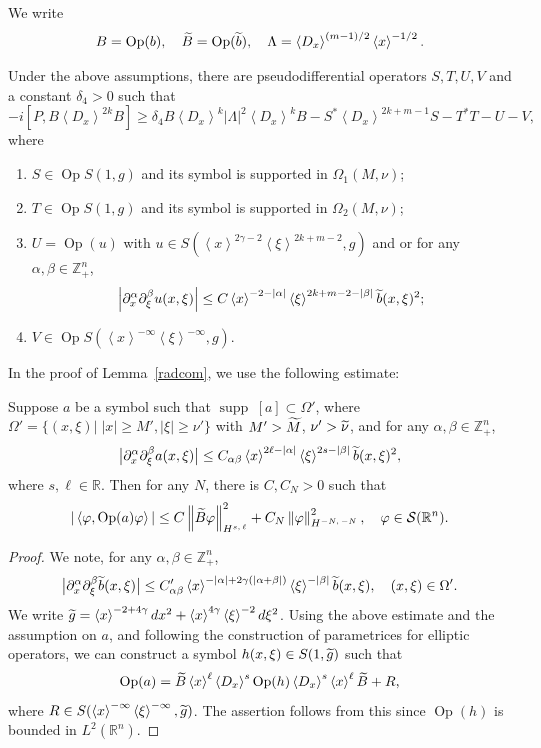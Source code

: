 \documentclass[AHL,Unicode,longabstracts,published]{cedram}
\renewcommand*\a{\alpha}
\renewcommand*\b{\beta}
\renewcommand*\c{\gamma}
\renewcommand*\d{\delta}
\newcommand*\f{\varphi}
\newcommand*\n{\nu}
\newcommand*\x{\xi}
\renewcommand{\L}{\Lambda}
\renewcommand{\O}{\Omega}
\DeclareMathOperator{\Op}{Op}
\newcommand*\re{\mathbb{R}}
\newcommand*\ze{\mathbb{Z}}
\newcommand{\clS}{\mathcal{S}}
\newcommand*\pa{\partial}
\DeclareMathOperator{\supp}{supp\;}
\newcommand{\jap}[1]{\left\langle #1 \right\rangle}
\newcommand{\norm}[1]{\left\| #1 \right\|}
\newcommand{\bigabs}[1]{\bigl| #1 \bigr|}
\let\oldtilde\tilde
\renewcommand*{\tilde}[1]{\mathchoice{\widetilde{#1}}{\widetilde{#1}}{\oldtilde{#1}}{\oldtilde{#1}}}
\begin{document}
We write
\[
B=\Op(b), \quad \tilde B =\Op(\tilde b), \quad \L=\jap{D_x}^{(m-1)/2}\jap{x}^{-1/2}.
\]

\begin{lemm}\label{radcom}
Under the above assumptions, there are pseudodifferential operators
$S,T,U, V$ and a constant $\d_4>0$ such that
\[
-i\left[P, B \jap{D_x}^{2k} B\right] \geq \d_4 B\jap{D_x}^k |\L|^2\jap{D_x}^k B -S^*\jap{D_x}^{2k+m-1}S-T^*T-U -V,
\]
where
\begin{enumerate}
\item $S\in \Op S(1,g)$ and its symbol is supported in $\O_1(M,\n)$;
\item $T\in \Op S(1, g)$ and its symbol is supported in $\O_2(M,\n)$;
\item $U=\Op(u)$ with $u\in S(\jap{x}^{2\c-2}\jap{\x}^{2k+m-2},g)$ and or for any $\a,\b\in\ze_+^n$,
\[
\left|\pa_{x}^{\a}\pa_{\x}^{\b}u(x,\x)\right|\leq C\jap{x}^{-2-|\a|}\jap{\x}^{2k+m-2-|\b|} \tilde b(x,\x)^2;
\]
\item $V\in \Op S(\jap{x}^{-\infty}\jap{\x}^{-\infty},g)$.
\end{enumerate}
\end{lemm}

In the proof of Lemma~\ref{radcom}, we use the following estimate:

\begin{lemm}\label{radell}
Suppose $a$ be a symbol such that $\supp[a]\subset\O'$, where\linebreak$\O'=\{(x,\x)|\;|x|\geq M',|\x|\geq \n'\}$ with $M'>\tilde M$, $\n'>\tilde\n$, and for any $\a,\b\in\ze_+^n$,
\[
\bigabs{\pa_x^\a\pa_\x^\b a(x,\x)}\leq C_{\a\b}\jap{x}^{2\ell-|\a|}\jap{\x}^{2s-|\b|}\tilde b(x,\x)^2,
\]
where $s,\ell\in\re$. Then for any $N$, there is $C,C_N>0$ such that
\[
|\jap{\f,\Op(a)\f}|\leq C \norm{\tilde B\f}^2_{H^{s,\,\ell}}+C_N\norm{\f}^2_{H^{-N,\,-N}},
\quad \f\in\clS(\re^n).
\]
\end{lemm}

\begin{proof}
We note, for any $\a,\b\in\ze_+^n$,
\[
\bigabs{\pa_x^\a\pa_\x^\b \tilde b(x,\x)}\leq C'_{\a\b}\jap{x}^{-|\a|+2\c(|\a+\b|)}\jap{\x}^{-|\b|}\tilde b(x,\x),
\quad(x,\x)\in\O'.
\]
We write $\tilde g= \jap{x}^{-2+4\c}dx^2+\jap{x}^{4\c}\jap{\x}^{-2}d\x^2$. Using the above estimate and the assumption on $a$, and following the construction of parametrices for elliptic operators, we can construct a symbol $h(x,\x)\in S(1,\tilde g)$ such that
\[
\Op(a) = \tilde B \jap{x}^\ell \jap{D_x}^s \Op(h) \jap{D_x}^s \jap{x}^\ell \tilde B +R,
\]
where $R\in S(\jap{x}^{-\infty}\jap{\x}^{-\infty},\tilde g)$. The assertion follows from this since $\Op(h)$ is bounded in $L^2(\re^n)$.
\end{proof}
\end{document}
